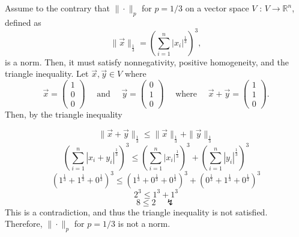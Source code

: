 \documentclass{article}
\newcommand{\R}{\mathbb{R}}
\begin{document}
\bigskip
Assume to the contrary that $\| \cdot \|_p$ for $p=1/3$ on a vector space $V$ : $V \longrightarrow \R^n$, defined as 
\begin{equation*}
\| \vec{x}\|_\frac{1}{3} = \left( \sum_{i=1}^n |x_i|^\frac{1}{3} \right)^{3},
\end{equation*}
is a norm. Then, it must satisfy nonnegativity, positive homogeneity, and the triangle inequality. 
Let $\vec{x}, \vec{y} \in V$ where
\begin{equation*}
    \vec{x}=\left(
                \begin{array}{r}
                    1\\0\\0
                \end{array}
            \right) \quad \text { and } \quad
    \vec{y}=\left(
                \begin{array}{r}
                    0\\1\\0
                \end{array}
            \right) \quad \text { where } \quad
    \vec{x}+\vec{y}=\left(
                \begin{array}{r}
                    1\\1\\0
                \end{array}
            \right).
\end{equation*}
Then, by the triangle inequality

\begin{equation}
    \| \vec{x}+\vec{y}\|_\frac{1}{3} \leq \| \vec{x}\|_\frac{1}{3} + 
    \| \vec{y}\|_\frac{1}{3}
\end{equation}
\begin{equation}
    \left( \sum_{i=1}^n |x_i+y_i|^\frac{1}{3}\right)^{3} \leq 
    \left( \sum_{i=1}^n |x_i|^\frac{1}{3}\right)^{3} +
    \left( \sum_{i=1}^n |y_i|^\frac{1}{3}\right)^{3}
\end{equation}
\begin{equation}
    \left(
        1^\frac{1}{3} + 1^\frac{1}{3} + 0^\frac{1}{3}
    \right)^3 \leq
    \left(
        1^\frac{1}{3} + 0^\frac{1}{3} + 0^\frac{1}{3}
    \right)^3 +
    \left(
        0^\frac{1}{3} + 1^\frac{1}{3} + 0^\frac{1}{3}
    \right)^3
\end{equation}
\begin{equation}
    2^3 \leq 1^3 + 1^3
\end{equation}
\begin{equation}
    8 \leq 2 \quad \lightning
\end{equation}
This is a contradiction, and thus the triangle inequality is not satisfied. Therefore, $\| \cdot \|_p$ for $p=1/3$ is not a norm.
\end{document}
